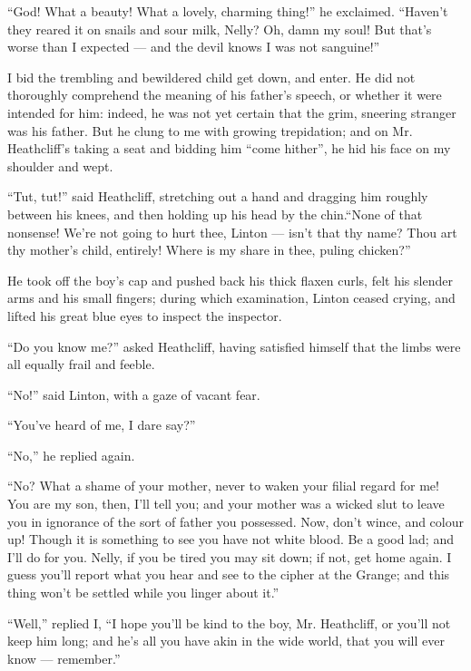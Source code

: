 \par “God! What a beauty! What a lovely, charming thing!” he exclaimed. “Haven't they reared it on snails and sour milk, Nelly? Oh, damn my soul! But that's worse than I expected — and the devil knows I was not sanguine!”
\par I bid the trembling and bewildered child get down, and enter. He did not thoroughly comprehend the meaning of his father's speech, or whether it were intended for him: indeed, he was not yet certain that the grim, sneering stranger was his father. But he clung to me with growing trepidation; and on Mr. Heathcliff's taking a seat and bidding him “come hither”, he hid his face on my shoulder and wept.
\par “Tut, tut!” said Heathcliff, stretching out a hand and dragging him roughly between his knees, and then holding up his head by the chin.“None of that nonsense! We're not going to hurt thee, Linton — isn't that thy name? Thou art thy mother's child, entirely! Where is my share in thee, puling chicken?”
\par He took off the boy's cap and pushed back his thick flaxen curls, felt his slender arms and his small fingers; during which examination, Linton ceased crying, and lifted his great blue eyes to inspect the inspector.
\par “Do you know me?” asked Heathcliff, having satisfied himself that the limbs were all equally frail and feeble.
\par “No!” said Linton, with a gaze of vacant fear.
\par “You've heard of me, I dare say?”
\par “No,” he replied again.
\par “No? What a shame of your mother, never to waken your filial regard for me! You are my son, then, I'll tell you; and your mother was a wicked slut to leave you in ignorance of the sort of father you possessed. Now, don't wince, and colour up! Though it is something to see you have not white blood. Be a good lad; and I'll do for you. Nelly, if you be tired you may sit down; if not, get home again. I guess you'll report what you hear and see to the cipher at the Grange; and this thing won't be settled while you linger about it.”
\par “Well,” replied I, “I hope you'll be kind to the boy, Mr. Heathcliff, or you'll not keep him long; and he's all you have akin in the wide world, that you will ever know — remember.”
